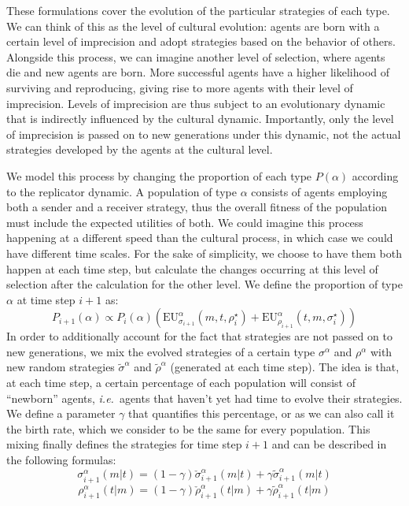 \documentclass[a4paper]{article}
\begin{document}
These formulations cover the evolution of the particular strategies of each type.
We can think of this as the level of cultural evolution: agents are born with a certain level of imprecision and adopt strategies based on the behavior of others.
Alongside this process, we can imagine another level of selection, where agents die and new agents are born.
More successful agents have a higher likelihood of surviving and reproducing, giving rise to more agents with their level of imprecision.
Levels of imprecision are thus subject to an evolutionary dynamic that is indirectly influenced by the cultural dynamic.
Importantly, only the level of imprecision is passed on to new generations under this dynamic, not the actual strategies developed by the agents at the cultural level.

We model this process by changing the proportion of each type $P(\alpha)$ according to the replicator dynamic.
A population of type $\alpha$ consists of agents employing both a sender and a receiver strategy, thus the overall fitness of the population must include the expected utilities of both.
We could imagine this process happening at a different speed than the cultural process, in which case we could have different time scales.
For the sake of simplicity, we choose to have them both happen at each time step, but calculate the changes occurring at this level of selection after the calculation for the other level.
We define the proportion of type $\alpha$ at time step $i+1$ as:
$$
P_{i+1}(\alpha) \propto P_i(\alpha)(\text{EU}_{\sigma_{i+1}}^{\alpha}(m,t,\rho_{i}^{\star}) + \text{EU}_{\rho_{i+1}}^{\alpha}(t,m,\sigma_{i}^{\star}))
$$
In order to additionally account for the fact that strategies are not passed on to new generations, we mix the evolved strategies of a certain type $\sigma^\alpha$ and $\rho^\alpha$ with new random strategies $\tilde{\sigma}^\alpha$ and $\tilde{\rho}^\alpha$ (generated at each time step).
The idea is that, at each time step, a certain percentage of each population will consist of ``newborn'' agents, \emph{i.e.}~agents that haven't yet had time to evolve their strategies.
We define a parameter $\gamma$ that quantifies this percentage, or as we can also call it the birth rate, which we consider to be the same for every population.
This mixing finally defines the strategies for time step $i+1$ and can be described in the following formulas:
$$
\sigma_{i+1}^{\alpha}(m|t)=(1 - \gamma)\check{\sigma}_{i+1}^{\alpha}(m|t) + \gamma \tilde{\sigma}_{i+1}^{\alpha}(m|t)
$$
$$
\rho_{i+1}^{\alpha}(t|m)=(1 - \gamma)\check{\rho}_{i+1}^{\alpha}(t|m) + \gamma \tilde{\rho}_{i+1}^{\alpha}(t|m)
$$
\end{document}
